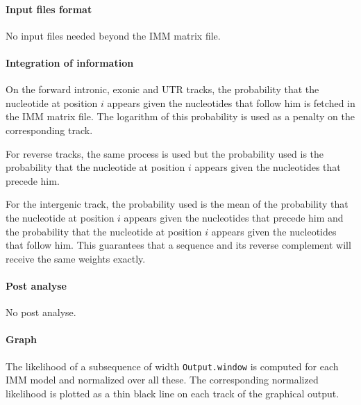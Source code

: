 \paragraph{Input files format}

No input files needed beyond the IMM matrix file. 

\paragraph{Integration of information}

On the forward intronic, exonic and UTR tracks, the probability that
the nucleotide at position $i$ appears given the nucleotides that
follow him is fetched in the IMM matrix file. The logarithm of this
probability is used as a penalty on the corresponding track.

For reverse tracks, the same process is used but the probability used
is the probability that the nucleotide at position $i$ appears given
the nucleotides that precede him.

For the intergenic track, the probability used is the mean of the
probability that the nucleotide at position $i$ appears given the
nucleotides that precede him and the probability that the nucleotide
at position $i$ appears given the nucleotides that follow him.  This
guarantees that a sequence and its reverse complement will receive the
same weights exactly.

\paragraph{Post analyse}

No post analyse.

\paragraph{Graph}

The likelihood of a subsequence of width \texttt{Output.window} is
computed for each IMM model and normalized over all these. The
corresponding normalized likelihood is plotted as a thin black line on
each track of the graphical output.


